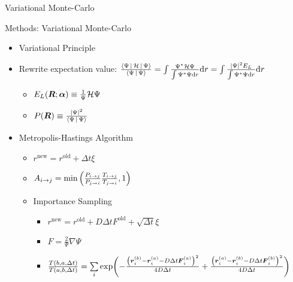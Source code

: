 \documentclass[10pt, t]{beamer}
\begin{document}
{
\begin{frame}[standout]
    Variational Monte-Carlo
\end{frame}}

\begin{frame}[fragile]{Methods: Variational Monte-Carlo}
    \begin{itemize}[<+->]
        \item Variational Principle
        \item Rewrite expectation value:
            $\frac{\Braket{\Psi|\mathcal{H}|\Psi}}{\Braket{\Psi|\Psi}} = \int
            \frac{{\Psi}^{*}\mathcal{H}\Psi}{\int {\Psi}^{*}\Psi \mathrm{d} r} \mathrm{d} r
            = \int \frac{\abs{\Psi}^2E_L}{\int {\Psi}^{*}\Psi \mathrm{d} r} \mathrm{d} r$
            \begin{itemize}
                \item $E_L(\boldsymbol{{R}};\boldsymbol{{\alpha}}) \equiv \frac{1}{\Psi}\mathcal{H}\Psi$
                \item $P(\boldsymbol{{R}}) \equiv \frac{\abs{\Psi}^2}{\Braket{\Psi|\Psi}}$
            \end{itemize}
        \item Metropolis-Hastings Algorithm
            \begin{itemize}
                \item $r^{\text{new}} = r^{\text{old}} + \Delta t \xi$
                \item $A_{i\rightarrow j} =
                    \text{min}\left(\frac{P_{i\rightarrow j}}{P_{j\rightarrow i}}
                    \frac{T_{i\rightarrow j}}{T_{j\rightarrow i}} ,1\right)$
                \item Importance Sampling
                    \begin{itemize}[<8->]
                        \item $r^{\text{new}} = r^{\text{old}} + D \Delta t
                            F^{\text{old}} + \sqrt{\Delta t}\xi$
                        \item $F = \frac{2}{\Psi}\nabla \Psi$ 
                        \item $\frac{T(b,a,\Delta t)}{T(a,b,\Delta t)} =
                            \sum\limits_i \exp(-\frac{\left(\boldsymbol{{r}}^{(b)}_i -
                            \boldsymbol{{r}}^{(a)}_i - D\Delta t
                            \boldsymbol{{F}}^{(a)}_i\right)^2}{4D\Delta t}
                            +\frac{\left(\boldsymbol{{r}}^{(a)}_i - \boldsymbol{{r}}^{(b)}_i -
                            D\Delta t \boldsymbol{{F}}^{(b)}_i\right)^2}{4D\Delta t})$
                    \end{itemize}
            \end{itemize}
    \end{itemize}
\end{frame}
\end{document}
